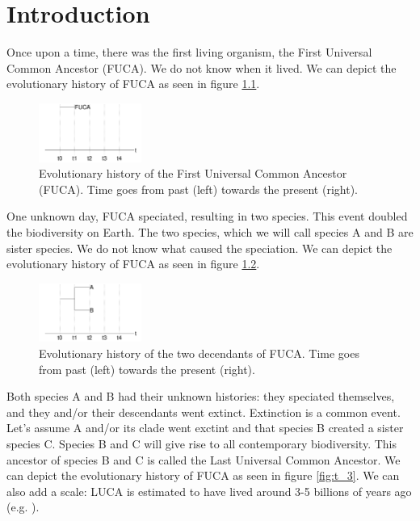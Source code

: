   \chapter{Introduction}
\label{chapter_introduction}
\newpage

\noindent

Once upon a time, there was the first living organism, the 
First Universal Common Ancestor (FUCA).
We do not know when it lived. We can depict the evolutionary
history of FUCA as seen in figure \ref{fig:t_0}.

\begin{figure}[H]
  \includegraphics[width=0.3\textwidth]{t_0.png}
  \caption{
    Evolutionary history of the First Universal Common Ancestor (FUCA).
    Time goes from past (left) towards the present (right).
  }
  \label{fig:t_0}
\end{figure}

One unknown day, FUCA speciated, resulting in two species.
This event doubled the biodiversity on Earth.
The two species, which we will call species A and B
are sister species.
We do not know what caused the speciation.
We can depict the evolutionary
history of FUCA as seen in figure \ref{fig:t_1}.

\begin{figure}[H]
  \includegraphics[width=0.3\textwidth]{t_1.png}
  \caption{
    Evolutionary history of the two decendants of FUCA.
    Time goes from past (left) towards the present (right).
  }
  \label{fig:t_1}
\end{figure}

Both species A and B had their unknown histories: they speciated themselves,
and they and/or their descendants went extinct. 
Extinction is a common event. Let's assume A and/or its clade went
exctint and that species B created a sister species C. Species B
and C will give rise to all contemporary biodiversity. 
This ancestor of species B and C 
is called the Last Universal Common Ancestor. 
We can depict the evolutionary
history of FUCA as seen in figure \ref{fig:t_3}.
We can also add a scale: LUCA is estimated to have lived around 3-5 
billions of years ago (e.g. \cite{bell2015}).

